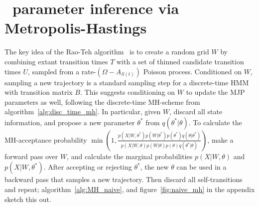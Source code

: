\section{\Naive\ parameter inference via Metropolis-Hastings}
The key idea of the Rao-Teh algorithm~\cite{RaoTeh13} is to create a random 
grid $W$ by combining extant transition times $T$ with a set of 
thinned candidate transition times $U$, sampled from a rate-$(\Omega-A_{S(t)})$ 
Poisson process. Conditioned on $W$, sampling a new trajectory is a 
standard sampling step for a discrete-time HMM with transition matrix $B$. 
This suggests conditioning on $W$ to update
the MJP parameters as well, following the discrete-time MH-scheme from
algorithm~\ref{alg:disc_time_mh}.
In particular, given $W$, discard all state information, and propose a 
new parameter $\theta^*$ from $q(\theta^*|\theta)$. 
To calculate the MH-acceptance probability $\min\left(1,
\frac{p(X|W,\theta^*)p(W|\theta^*)p(\theta^*)q(\theta|\theta^*)}
     {p(X|W,\theta)p(W|\theta)p(\theta)q(\theta^*|\theta)}\right)$, 
make a forward pass over $W$, and calculate the marginal 
probabilities $p(X|W,\theta)$ and $p(X|W,\theta^*)$. %
After accepting or rejecting $\theta^*$, the new $\theta$ can be used in
a backward pass that samples a new trajectory. Then discard all 
self-transitions and repeat; algorithm~\ref{alg:MH_naive}, and 
figure~\ref{fig:naive_mh} in the appendix sketch this out.
\vspace{-.1in}
